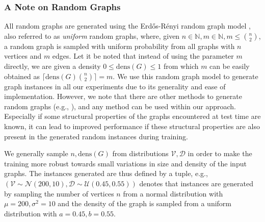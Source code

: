 \documentclass[draft,final]{vutinfth} %
\begin{document}

\subsubsection{A Note on Random Graphs}
All random graphs are generated using the Erd\H{o}s-Rényi random graph model \cite{erdos59a}, also referred to as \emph{uniform} random graphs, where, given $n \in \mathbb{N}, m \in \mathbb{N}, m \leq \binom{n}{2}$, a random graph is sampled with uniform probability from all graphs with $n$ vertices and $m$ edges. Let it be noted that instead of using the parameter $m$ directly, we are given a density $0 \leq \mathrm{dens}(G) \leq 1$ from which $m$ can be easily obtained as $\lceil \mathrm{dens}(G) \binom{n}{2} \rceil = m$. 
We use this random graph model to generate graph instances in all our experiments due to its generality and ease of implementation. 
However, we note that there are other methods to generate random graphs (e.g., \cite{Aiello2001}), and any method can be used within our approach. Especially if some structural properties of the graphs encountered at test time are known, it can lead to improved performance if these structural properties are also present in the generated random instances during training. 

We generally sample $n, \mathrm{dens}(G)$ from distributions $\mathcal{V}, \mathcal{D}$ in order to make the training more robust towards small variations in size and density of the input graphs. The instances generated are thus defined by a tuple, e.g., $(\mathcal{V} \sim \mathcal{N}(200, 10), \mathcal{D} \sim \mathcal{U}(0.45, 0.55))$ denotes that instances are generated by sampling the number of vertices $n$ from a normal distribution with $\mu=200, \sigma^2 = 10$ and the density of the graph is sampled from a uniform distribution with $a=0.45, b=0.55$.
\end{document}
